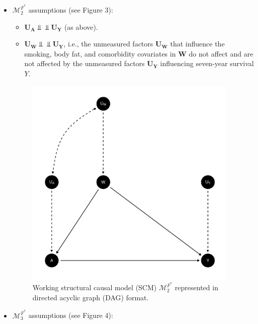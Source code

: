 \documentclass{article}\usepackage[]{graphicx}\usepackage[]{xcolor}
\newenvironment{knitrout}{}{} %
\begin{document}
\begin{enumerate}[label=\textbf{\arabic*.}]
\begin{enumerate}[label=\textbf{(\alph*)}]
\begin{itemize}
\pagebreak

  \item $\mathcal{M}^{F^*}_2$ assumptions (see Figure 3): 
  
  \begin{itemize} 
  
    \item $\bm{U_A} \Perp \!\!\! \Perp \bm{U_Y}$ (as above).
    
    \item $\bm{U_W} \Perp \!\!\! \Perp \bm{U_Y}$, i.e., the unmeasured factors $\bm{U_W}$ that influence the smoking, body fat, and comorbidity covariates in $\bm{W}$ do not affect and are not affected by the unmeasured factors $\bm{U_Y}$ influencing seven-year survival $Y$.
    
  \end{itemize}
  
\begin{figure}
  \caption{Working structural causal model (SCM) $\mathcal{M}^{F^*}_2$ represented in directed acyclic graph (DAG) format.}
  \centering
  
\begin{knitrout}
\color{fgcolor}
\includegraphics[width=4in]{figure/unnamed-chunk-4-1} 

\end{knitrout}

\end{figure}

\pagebreak

  \item $\mathcal{M}^{F^*}_3$ assumptions (see Figure 4): 
  

\end{itemize}
\end{enumerate}
\end{enumerate}
\end{document}
